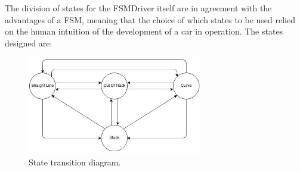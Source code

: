	The division of states for the FSMDriver itself are in agreement with the advantages of a FSM, meaning that the choice of
	which states to be used relied on the human intuition of the development of a car in operation. The states designed are:

\begin{figure}[!t]
	\centering
	\includegraphics[width=3in]{StatesDiagram}
	\caption{State transition diagram.}
	\label{fig_sim}
\end{figure}

